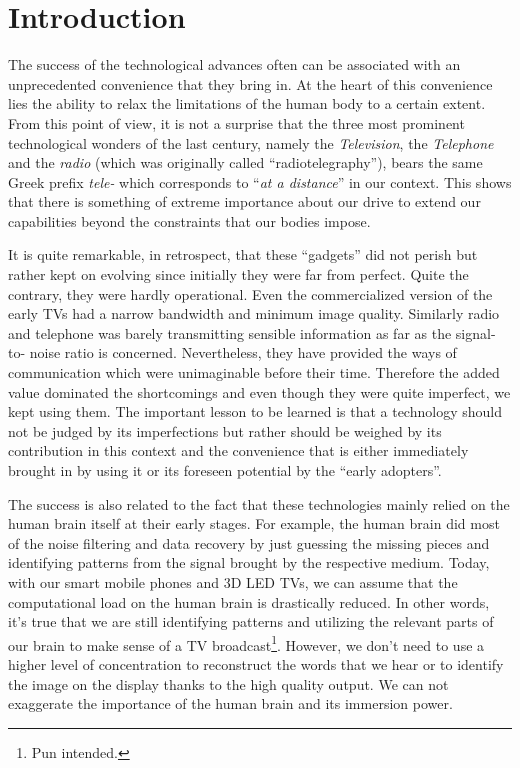 
\chapter{Introduction}
\label{chap:intro}

The success of the technological advances often can be associated with an unprecedented convenience that they bring in. At the heart of 
this convenience lies the ability to relax the limitations of the human body to a certain extent. From this point of view, it is not a 
surprise that the three most prominent technological wonders of the last century, namely the \emph{Television}, the \emph{Telephone} and 
the \emph{radio} (which was originally called \enquote{radiotelegraphy}), bears the same Greek prefix \emph{tele-} which corresponds to 
\enquote{\emph{at a distance}} in our context. This shows that there is something of extreme importance about our drive to extend our 
capabilities beyond the constraints that our bodies impose.


It is quite remarkable, in retrospect, that these \enquote{gadgets} did not perish but rather kept on evolving since initially they were 
far from perfect. Quite the contrary, they were hardly operational. Even the commercialized version of the early TVs had a narrow 
bandwidth and minimum image quality. Similarly radio and telephone was barely transmitting sensible information as far as the signal-to-
noise ratio is concerned. Nevertheless, they have provided the ways of communication which were unimaginable before their time. Therefore 
the added value dominated the shortcomings and even though they were quite imperfect, we kept using them. The important lesson to be 
learned is that a technology should not be judged by its imperfections but rather should be weighed by its contribution in this context 
and the convenience that is either immediately brought in by using it or its foreseen potential by the \enquote{early adopters}.

The success is also related to the fact that these technologies mainly relied on the human brain itself at their early stages. For 
example, the human brain did most of the noise filtering and data recovery by just guessing the missing pieces and identifying patterns 
from the signal brought by the respective medium. Today, with our smart mobile phones and 3D LED TVs, we can assume that the 
computational load on the human brain is drastically reduced. In other words, it's true that we are still identifying patterns and 
utilizing the relevant parts of our brain to make sense of a TV broadcast\footnote{Pun intended.}. However, we don't need to use a higher 
level of concentration to reconstruct the words that we hear or to identify the image on the display thanks to the high quality output. 
We can not exaggerate the importance of the human brain and its immersion power. 

